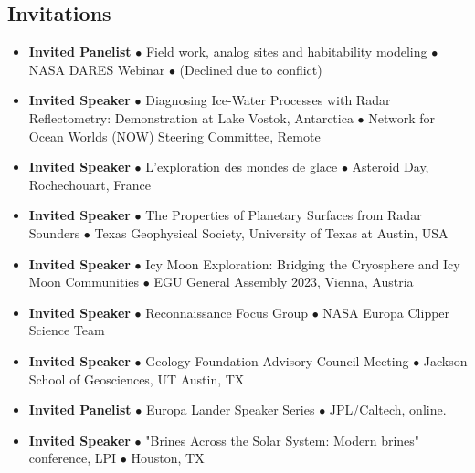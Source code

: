 \vspace{-1.5em}
\subsection*{Invitations}

\begin{itemize}[leftmargin=3.8em, labelsep=1.5em]
    \setlength\itemsep{-.5em}
    \item[\texttt{2026}] \textbf{Invited Panelist} $\bullet$ Field work, analog sites and habitability modeling $\bullet$ NASA DARES Webinar $\bullet$ (Declined due to conflict)
    
    \item[\texttt{2025}] \textbf{Invited Speaker} $\bullet$ Diagnosing Ice-Water Processes with Radar Reflectometry: Demonstration at Lake Vostok, Antarctica $\bullet$ Network for Ocean Worlds (NOW) Steering Committee, Remote
    
    \item[\texttt{2025}] \textbf{Invited Speaker} $\bullet$ L'exploration des mondes de glace $\bullet$ Asteroid Day, Rochechouart, France
    
    \item[\texttt{2024}] \textbf{Invited Speaker} $\bullet$ The Properties of Planetary Surfaces from Radar Sounders $\bullet$ Texas Geophysical Society, University of Texas at Austin, USA
    
    \item[\texttt{2023}] \textbf{Invited Speaker} $\bullet$ Icy Moon Exploration: Bridging the Cryosphere and Icy Moon Communities $\bullet$  EGU General Assembly 2023, Vienna, Austria
    
    \item[\texttt{2022}] \textbf{Invited Speaker} $\bullet$ Reconnaissance Focus Group $\bullet$ NASA Europa Clipper Science Team
    
    \item[\texttt{2022}] \textbf{Invited Speaker} $\bullet$ Geology Foundation Advisory Council Meeting $\bullet$ Jackson School of Geosciences, UT Austin, TX
    
    \item[\texttt{2022}] \textbf{Invited Panelist} $\bullet$ Europa Lander Speaker Series $\bullet$ JPL/Caltech, online.
    
    \item[\texttt{2021}] \textbf{Invited Speaker} $\bullet$ "Brines Across the Solar System: Modern brines" conference, LPI $\bullet$ Houston, TX
    

\end{itemize}

